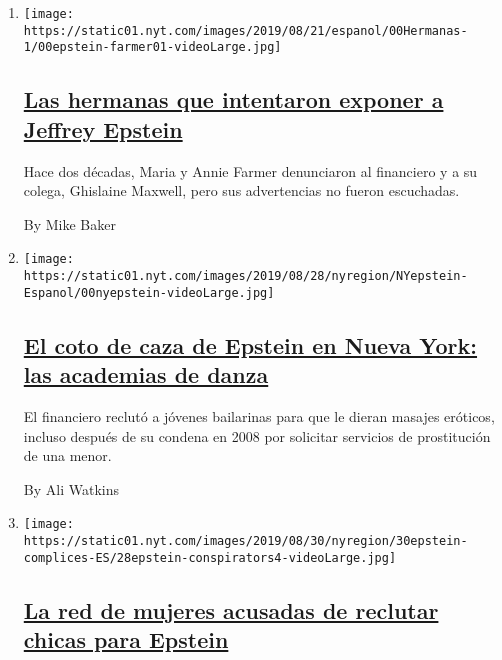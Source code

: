 \begin{enumerate}
\def\labelenumi{\arabic{enumi}.}
\item
  \texttt{[image: https://static01.nyt.com/images/2019/08/21/espanol/00Hermanas-1/00epstein-farmer01-videoLarge.jpg]}

  \hypertarget{las-hermanas-que-intentaron-exponer-a-jeffrey-epstein}{%
  \subsection{\texorpdfstring{\href{/es/2019/08/27/espanol/mundo/jeffrey-epstein-mujeres-denuncias.html}{Las
  hermanas que intentaron exponer a Jeffrey
  Epstein}}{Las hermanas que intentaron exponer a Jeffrey Epstein}}\label{las-hermanas-que-intentaron-exponer-a-jeffrey-epstein}}

  Hace dos décadas, Maria y Annie Farmer denunciaron al financiero y a
  su colega, Ghislaine Maxwell, pero sus advertencias no fueron
  escuchadas.

  By Mike Baker
\item
  \texttt{[image: https://static01.nyt.com/images/2019/08/28/nyregion/NYepstein-Espanol/00nyepstein-videoLarge.jpg]}

  \hypertarget{el-coto-de-caza-de-epstein-en-nueva-york-las-academias-de-danza}{%
  \subsection{\texorpdfstring{\href{/es/2019/09/03/espanol/mundo/epstein-bailarinas-nueva-york.html}{El
  coto de caza de Epstein en Nueva York: las academias de
  danza}}{El coto de caza de Epstein en Nueva York: las academias de danza}}\label{el-coto-de-caza-de-epstein-en-nueva-york-las-academias-de-danza}}

  El financiero reclutó a jóvenes bailarinas para que le dieran masajes
  eróticos, incluso después de su condena en 2008 por solicitar
  servicios de prostitución de una menor.

  By Ali Watkins
\item
  \texttt{[image: https://static01.nyt.com/images/2019/08/30/nyregion/30epstein-complices-ES/28epstein-conspirators4-videoLarge.jpg]}

  \hypertarget{la-red-de-mujeres-acusadas-de-reclutar-chicas-para-epstein}{%
  \subsection{\texorpdfstring{\href{/es/2019/08/30/espanol/mundo/jeffrey-epstein-ghislaine-maxwell.html}{La
  red de mujeres acusadas de reclutar chicas para
  Epstein}}{La red de mujeres acusadas de reclutar chicas para Epstein}}\label{la-red-de-mujeres-acusadas-de-reclutar-chicas-para-epstein}}


\end{enumerate}
